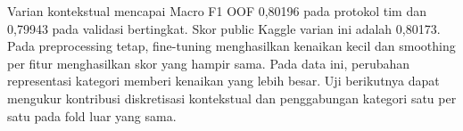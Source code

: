 Varian kontekstual mencapai Macro F1 OOF 0,80196 pada protokol tim dan 0,79943 pada validasi bertingkat. Skor public Kaggle varian ini adalah 0,80173. Pada preprocessing tetap, fine-tuning menghasilkan kenaikan kecil dan smoothing per fitur menghasilkan skor yang hampir sama. Pada data ini, perubahan representasi kategori memberi kenaikan yang lebih besar. Uji berikutnya dapat mengukur kontribusi diskretisasi kontekstual dan penggabungan kategori satu per satu pada fold luar yang sama.
